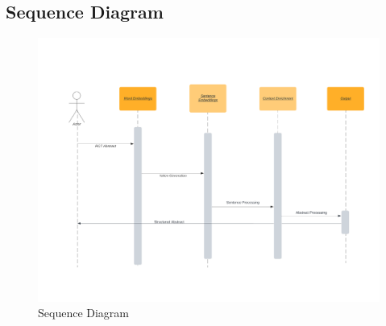 \documentclass[12pt,a4paper]{report}     %
\begin{document}
\begin{normalsize}
{{%
\subsection{Sequence Diagram}
\begin{figure}[h]
    \centering
    \includegraphics[width=15cm]{Sequence diagram.png}
    \caption{Sequence Diagram}
    \label{fig: sequence diagram}
\end{figure}



}




}
\end{normalsize}
\end{document}
